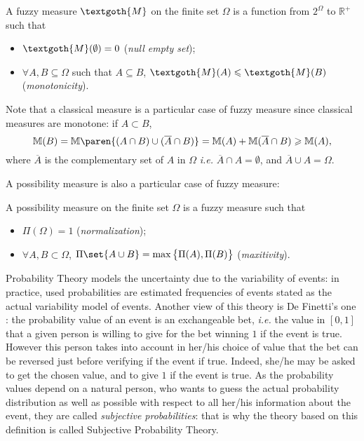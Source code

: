 \begin{Def}
\label{fuzzy_measure}
A fuzzy measure $\textgoth{M}$ on the finite set $\Omega$ is a function from $2^{\Omega}$ to $\mathbb{R}^{+}$ such that
\begin{itemize}
\item $\textgoth{M}(\emptyset) = 0$ (\textit{null empty set});
\item $\forall A,B \subseteq \Omega$ such that $A \subseteq B$, $\textgoth{M}(A) \leqslant \textgoth{M}(B)$ (\textit{monotonicity}).
\end{itemize}
\end{Def}
Note that a classical measure is a particular case of fuzzy measure
since classical measures are monotone: 
if $A \subset B$, 
\[ \mathbb{M}(B) = \mathbb{M} \paren{ (A \cap B) \cup (\overline{A} \cap B) } = \mathbb{M}( A ) + \mathbb{M} (\overline{A} \cap B) \geqslant  \mathbb{M}( A ), \]
where $\overline{A}$ is the complementary set of $A$ in $\Omega$ \textit{i.e.} $\overline{A} \cap A = \emptyset$, and $\overline{A} \cup A = \Omega$.

A possibility measure is also a particular case of fuzzy measure:
\begin{Def}
\label{poss_measure}
A possibility measure on the finite set $\Omega$ is a fuzzy measure such that
\begin{itemize}
\item $\Pi(\Omega) = 1$ (\textit{normalization});
\item $\forall A,B \subset \Omega$, $\Pi \set{ A \cup B } = \max \big\{ \Pi(A), \Pi(B) \big\}$ (\textit{maxitivity}).
\end{itemize}
\end{Def}

Probability Theory models the uncertainty due to the variability of events:
in practice, used probabilities are estimated frequencies of events
stated as the actual variability model of events. 
Another view of this theory is De Finetti's one \cite{de1974theory}:
the probability value of an event is an exchangeable bet, \textit{i.e.}
the value in $[0,1]$ that a given person is willing to give
for the bet winning $1$ if the event is true.
However this person takes into account in her/his choice of value
that the bet can be reversed just before verifying if the event if true.
Indeed, she/he may be asked to get the chosen value,
and to give $1$ if the event is true.
As the probability values depend on a natural person,
who wants to guess the actual probability distribution 
as well as possible with respect to all her/his information about the event,
they are called \textit{subjective probabilities}:
that is why the theory based on this definition is called
Subjective Probability Theory.


